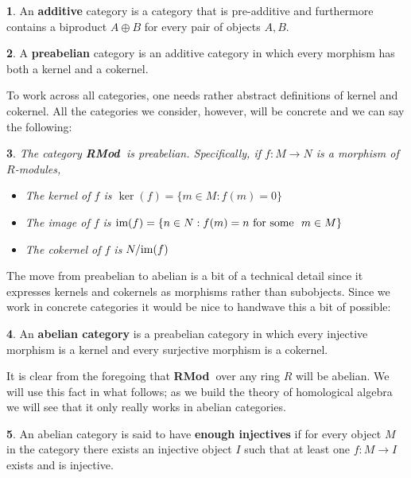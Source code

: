 \documentclass[oneside,english]{amsbook}
\numberwithin{section}{chapter}
\theoremstyle{plain}
\newtheorem{thm}{\protect\theoremname}
\theoremstyle{definition}
\newtheorem{defn}[thm]{\protect\definitionname}
\providecommand{\definitionname}{Definition}
\providecommand{\theoremname}{Theorem}
\newcommand{\catname}[1]{{\normalfont\textbf{#1}}}
\newcommand{\RMod}{\catname{RMod\ }}
\newcommand{\im}{\text{\upshape{im}}}
\begin{document}
			\begin{defn}
				An \textbf{additive} category is a category that is pre-additive and furthermore contains a biproduct $A\oplus B$ for every pair of objects $A, B$.
			\end{defn}
			
			\begin{defn}
				A \textbf{preabelian} category is an additive category in which every morphism has both a kernel and a cokernel.
			\end{defn}
			
			To work across all categories, one needs rather abstract definitions of kernel and cokernel. All the categories we consider, however, will be concrete and we can say the following:
			
			\begin{thm}
				The category \RMod is preabelian. Specifically, if $f:M\to N$ is a morphism of $R$-modules,
				\begin{itemize}
					\item The kernel of $f$ is $\ker(f) = \{m\in M : f(m) = 0\}$
					\item The image of $f$ is $\im(f) = \{n\in N : f(m) = n\ \text{for some }\ m\in M\}$
					\item The cokernel of $f$ is $N/\im(f)$
				\end{itemize}
			\end{thm}
			
			The move from preabelian to abelian is a bit of a technical detail since it expresses kernels and cokernels as morphisms rather than subobjects. Since we work in concrete categories it would be nice to handwave this a bit of possible: 
			
			\begin{defn}
				An \textbf{abelian category} is a preabelian category in which every injective morphism is a kernel and every surjective morphism is a cokernel.
			\end{defn}
			
			It is clear from the foregoing that \RMod over any ring $R$ will be abelian. We will use this fact in what follows; as we build the theory of homological algebra we will see that it only really works in abelian categories.
			
			\begin{defn}
				An abelian category is said to have \textbf{enough injectives} if for every object $M$ in the category there exists an injective object $I$ such that at least one $f:M\to I$ exists and is injective.
			\end{defn}
\end{document}
